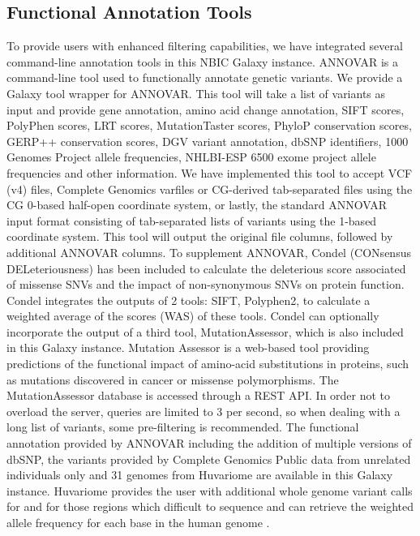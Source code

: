\documentclass[10pt]{bmc_article}
\newenvironment{bmcformat}{\begin{raggedright}\baselineskip20pt\sloppy\setboolean{publ}{false}}{\end{raggedright}\baselineskip20pt\sloppy}
\begin{document}
\begin{bmcformat}
\subsection*{Functional Annotation Tools}
To provide users with enhanced filtering capabilities, we have integrated several command-line annotation tools in this NBIC Galaxy instance. ANNOVAR \cite{annovar} is a command-line tool used to functionally annotate genetic variants. We provide a Galaxy tool wrapper for ANNOVAR. This tool will take a list of variants as input and provide gene annotation, amino acid change annotation, SIFT scores, PolyPhen scores, LRT scores, MutationTaster scores, PhyloP conservation scores, GERP++ conservation scores, DGV variant annotation, dbSNP identifiers, 1000 Genomes Project allele frequencies, NHLBI-ESP 6500 exome project allele frequencies and other information.  We have implemented this tool to accept VCF (v4) files, Complete Genomics varfiles or CG-derived tab-separated files using the CG 0-based half-open coordinate system, or lastly, the standard ANNOVAR input format consisting of tab-separated lists of variants using the 1-based coordinate system.  This tool will output the original file columns, followed by additional ANNOVAR columns.  To supplement ANNOVAR, Condel (CONsensus DELeteriousness) \cite{condel} has been included to calculate the deleterious score associated of missense SNVs and the impact of non-synonymous SNVs on protein function. Condel integrates the outputs of 2 tools: SIFT, Polyphen2, to calculate a weighted average of the scores (WAS) of these tools. Condel can optionally incorporate the output of a third tool, MutationAssessor, which is also included in this Galaxy instance. Mutation Assessor \cite{mutass} is a web-based tool providing predictions of the functional impact of amino-acid substitutions in proteins, such as mutations discovered in cancer or missense polymorphisms. The MutationAssessor database is accessed through a REST API.  In order not to overload the server, queries are limited to 3 per second, so when dealing with a long list of variants, some pre-filtering is recommended. The functional annotation provided by ANNOVAR including the addition of multiple versions of dbSNP, the variants provided by Complete Genomics Public data from unrelated individuals only \cite{url-cgftp} and 31 genomes from Huvariome \cite{huvariome} are available in this Galaxy instance. Huvariome provides the user with additional whole genome variant calls for and for those regions which difficult to sequence and can retrieve the weighted allele frequency for each base in the human genome \cite{huvariome}.   


\end{bmcformat}
\end{document}
